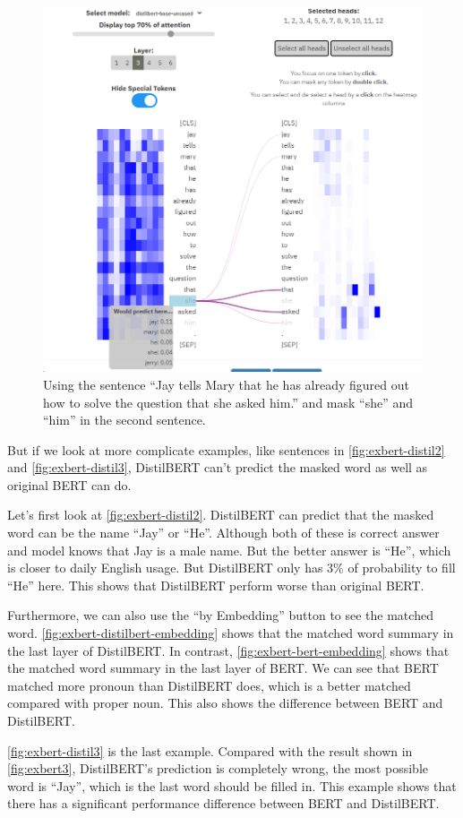 \documentclass{article}[12pt]
\begin{document}
\begin{figure}[htbp]
	\centering
	\includegraphics[width=0.7\linewidth]{figure/exbert-distil3}
	\caption{Using the sentence ``Jay tells Mary that he has already figured out how to solve the question that she asked him.'' and mask ``she'' and ``him'' in the second sentence.}
	\label{fig:exbert-distil3}
\end{figure}

But if we look at more complicate examples, like sentences in \autoref{fig:exbert-distil2} and \autoref{fig:exbert-distil3}, DistilBERT can't predict the masked word as well as original BERT can do.

Let's first look at \autoref{fig:exbert-distil2}. DistilBERT can predict that the masked word can be the name ``Jay'' or ``He''. Although both of these is correct answer and model knows that Jay is a male name. But the better answer is ``He'', which is closer to daily English usage. But DistilBERT only has 3\% of probability to fill ``He'' here. This shows that DistilBERT perform worse than original BERT. 

Furthermore, we can also use the ``by Embedding'' button to see the matched word. \autoref{fig:exbert-distilbert-embedding} shows that the matched word summary in the last layer of DistilBERT. In contrast, \autoref{fig:exbert-bert-embedding} shows that the matched word summary in the last layer of BERT. We can see that BERT matched more pronoun than DistilBERT does, which is a better matched compared with proper noun. This also shows the difference between BERT and DistilBERT.

\autoref{fig:exbert-distil3} is the last example. Compared with the result shown in \autoref{fig:exbert3}, DistilBERT's prediction is completely wrong, the most possible word is ``Jay'', which is the last word should be filled in. This example shows that there has a significant performance difference between BERT and DistilBERT.
\end{document}
